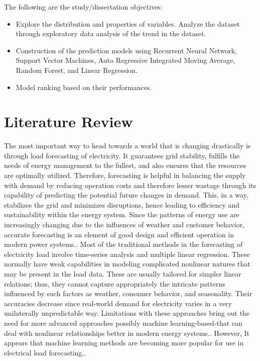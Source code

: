 \documentclass[12pt, a4paper,twoside]{report}
\theoremstyle{plain} %
\theoremstyle{definition} %
\theoremstyle{remark} %
\numberwithin{equation}{chapter}
\begin{document}
\newline
The following are the study/dissertation objectives:
\begin{itemize}
    \item Explore the distribution and properties of variables. Analyze the dataset through exploratory data analysis of the trend in the dataset.
    \item Construction of the prediction models using Recurrent Neural Network, Support Vector Machines, Auto Regressive Integrated Moving Average, Random Forest, and Linear Regression.
    \item Model ranking based on their performances.
\end{itemize}

\chapter{Literature Review}\label{ch:2}
The most important way to head towards a world that is changing drastically is through load forecasting of electricity. It guarantees grid stability, fulfills the needs of energy management to the fullest, and also ensures that the resources are optimally utilized. Therefore, forecasting is helpful in balancing the supply with demand by reducing operation costs and therefore lesser wastage through its capability of predicting the potential future changes in demand. This, in a way, stabilizes the grid and minimizes disruptions, hence leading to efficiency and sustainability within the energy system. Since the patterns of energy use are increasingly changing due to the influences of weather and customer behavior, accurate forecasting is an element of good design and efficient operation in modern power systems.\cite{zhang2021review}. Most of the traditional methods in the forecasting of electricity load involve time-series analysis and multiple linear regression. These normally have weak capabilities in modeling complicated nonlinear natures that may be present in the load data. These are usually tailored for simpler linear relations; thus, they cannot capture appropriately the intricate patterns influenced by such factors as weather, consumer behavior, and seasonality. Their accuracies decrease since real-world demand for electricity varies in a very unilaterally unpredictable way. Limitations with these approaches bring out the need for more advanced approaches possibly machine learning-based-that can deal with nonlinear relationships better in modern energy systems.\cite{li2023short}. However, It appears that machine learning methods are becoming more popular for use in electrical load forecasting.\cite{long2022prophet}.
\end{document}
